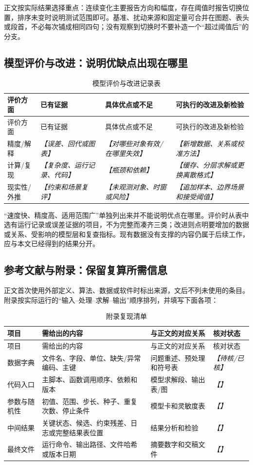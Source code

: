 \documentclass[UTF8,zihao=-4]{ctexart}
\newcommand{\slot}[1]{\textcolor{inkblue}{\textit{【#1】}}}
\begin{document}
正文按实际结果选择重点：连续变化主要报告方向和幅度，存在阈值时报告切换位置，排序未变时说明测试范围即可。基准、扰动来源和固定量可合并在图题、表头或段首，不必每次铺成相同四句；没有观察到切换时不要补造一个“超过阈值后”的分支。

\subsection{模型评价与改进：说明优缺点出现在哪里}

\begin{longtable}{p{2.3cm}p{4.0cm}p{3.6cm}p{3.8cm}}
\caption{模型评价与改进记录表}\label{tab:template-evaluation-ledger}\\
\toprule
评价方面 & 已有证据 & 具体优点或不足 & 可执行的改进及新检验\\
\midrule
\endfirsthead
\toprule
评价方面 & 已有证据 & 具体优点或不足 & 可执行的改进及新检验\\
\midrule
\endhead
精度/解释 & \slot{误差、回代或图表} & \slot{对哪些对象有效/在哪里失效} & \slot{新增数据、关系或校准方法}\\
计算/复现 & \slot{复杂度、运行记录、代码} & \slot{瓶颈和依赖} & \slot{缓存、分层求解或更换离散格式}\\
现实性/外推 & \slot{约束和场景复评} & \slot{未观测对象、时窗或风险} & \slot{追加样本、边界场景和接受阈值}\\
\bottomrule
\end{longtable}

“速度快、精度高、适用范围广”单独列出来并不能说明优点在哪里。评价时从表中选有运行记录或误差证据的项目，不为完整而凑齐三类；改进则点明要增加的数据或关系、受影响的模型层和复查指标。现有数据没有支撑的内容仍属于后续工作，应与本文已经得到的结果分开。

\subsection{参考文献与附录：保留复算所需信息}

正文首次使用外部定义、算法、数据或软件时标出来源，文后不列未使用的条目。附录按实际运行的“输入--处理--求解--输出”顺序排列，并填写下面各项：

\begin{longtable}{p{3.0cm}p{4.2cm}p{4.2cm}p{3.2cm}}
\caption{附录复现清单}\label{tab:template-appendix-ledger}\\
\toprule
项目 & 需给出的内容 & 与正文的对应关系 & 核对状态\\
\midrule
\endfirsthead
\toprule
项目 & 需给出的内容 & 与正文的对应关系 & 核对状态\\
\midrule
\endhead
数据字典 & 文件名、字段、单位、缺失/异常编码、主键 & 问题重述、预处理和符号表 & \slot{待核/已核}\\
代码入口 & 主脚本、函数调用顺序、依赖和版本 & 模型求解段、输出表/图 & \slot{}\\
参数与随机性 & 初值、范围、步长、种子、重复次数、停止条件 & 模型卡和灵敏度表 & \slot{}\\
中间结果 & 关键状态、候选、约束残差、日志或完整结果表位置 & 结果分析和检验 & \slot{}\\
最终文件 & 运行命令、输出路径、文件哈希或版本日期 & 摘要数字和交稿文件 & \slot{}\\
\bottomrule
\end{longtable}
\end{document}
